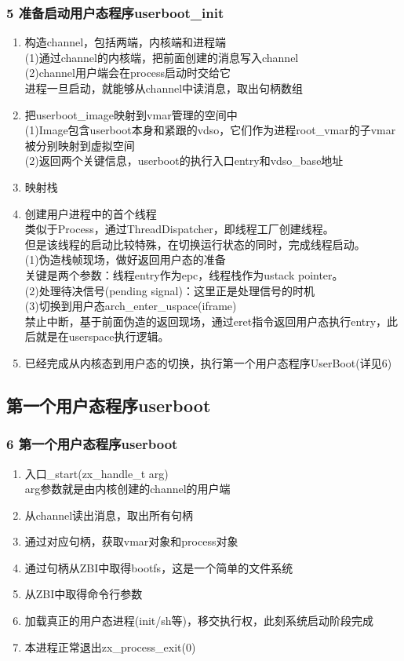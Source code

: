 \documentclass[
8pt, %
]{beamer}
\begin{document}
	\begin{frame}
		\frametitle{5 准备启动用户态程序userboot\_init}
		\begin{enumerate}
			\item 构造channel，包括两端，内核端和进程端\\
			(1)通过channel的内核端，把前面创建的消息写入channel\\
			(2)channel用户端会在process启动时交给它\\
			进程一旦启动，就能够从channel中读消息，取出句柄数组
			\item 把userboot\_image映射到vmar管理的空间中\\
			(1)Image包含userboot本身和紧跟的vdso，它们作为进程root\_vmar的子vmar被分别映射到虚拟空间\\
			(2)返回两个关键信息，userboot的执行入口entry和vdso\_base地址\\
			\item 映射栈
			\item 创建用户进程中的首个线程\\
			类似于Process，通过ThreadDispatcher，即线程工厂创建线程。\\
			但是该线程的启动比较特殊，在切换运行状态的同时，完成线程启动。\\
			(1)伪造栈帧现场，做好返回用户态的准备\\
			关键是两个参数：线程entry作为epc，线程栈作为ustack pointer。\\
			(2)处理待决信号(pending signal)：这里正是处理信号的时机\\
			(3)切换到用户态arch\_enter\_uspace(iframe)\\
			禁止中断，基于前面伪造的返回现场，通过eret指令返回用户态执行entry，此后就是在userspace执行逻辑。
			\item 已经完成从内核态到用户态的切换，执行第一个用户态程序UserBoot(详见6)
		\end{enumerate}
	\end{frame}

	\subsection{第一个用户态程序userboot}

	\begin{frame}
		\frametitle{6 第一个用户态程序userboot}
		\begin{enumerate}
			\item 入口\_start(zx\_handle\_t arg)\\
			arg参数就是由内核创建的channel的用户端
			\item 从channel读出消息，取出所有句柄
			\item 通过对应句柄，获取vmar对象和process对象
			\item 通过句柄从ZBI中取得bootfs，这是一个简单的文件系统
			\item 从ZBI中取得命令行参数
			\item 加载真正的用户态进程(init/sh等)，移交执行权，此刻系统启动阶段完成
			\item 本进程正常退出zx\_process\_exit(0)
		\end{enumerate}
	\end{frame}
\end{document}
